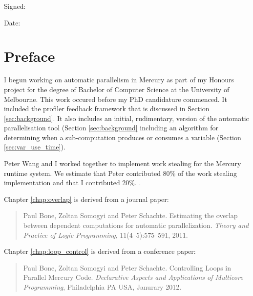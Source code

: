 \documentclass[a4paper,twoside]{report}
\begin{document}
\noindent Signed:

\vspace{1em}

\noindent Date:

\chapter*{Preface}

I begun working on automatic parallelism in Mercury as part of my Honours project
for the degree of Bachelor of Computer Science at the University of Melbourne.
This work occured before my PhD candidature commenced.
It included the profiler feedback framework that is discussed in Section
\ref{sec:background}.
It also includes an initial, rudimentary, version of the automatic
parallelisation tool
(Section \ref{sec:background}
including an algorithm for determining when a sub-computation produces or
consumes a variable (Section \ref{sec:var_use_time}).

Peter Wang and I worked together to implement work stealing for the Mercury
runtime system.
We estimate that Peter contributed 80\% of the work stealing implementation
and that I contributed 20\%.
.

Chapter \ref{chap:overlap} is derived from a journal paper:


\begin{quote}
Paul Bone, Zoltan Somogyi and Peter Schachte.
Estimating the overlap between dependent computations for automatic
parallelization.
{\em Theory and Practice of Logic Programming}, 11(4--5):575--591, 2011.
\end{quote}


Chapter \ref{chap:loop_control} is derived from a conference paper:

\begin{quote}
Paul Bone, Zoltan Somogyi and Peter Schachte.
Controlling Loops in Parallel Mercury Code.
{\em Declarative Aspects and Applications of Multicore Programming},
Philadelphia PA USA, Janurary 2012.
\end{quote}
\end{document}
